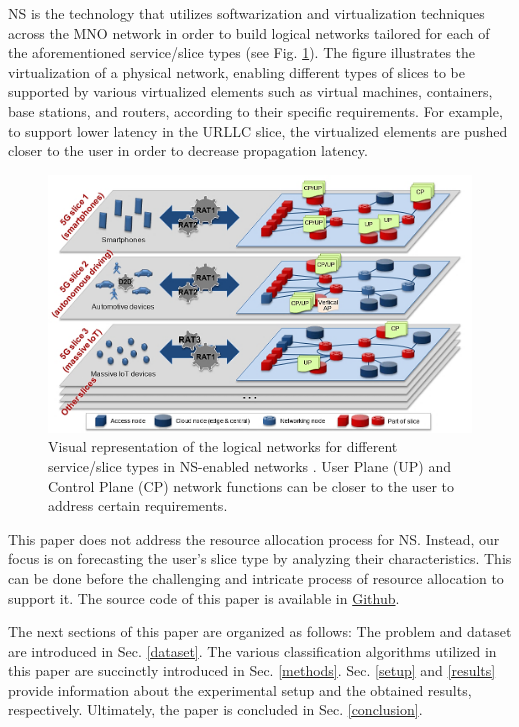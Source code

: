 \documentclass[conference]{IEEEtran}
\begin{document}
NS is the technology that utilizes softwarization and virtualization techniques across the MNO network in order to build logical networks tailored for each of the aforementioned service/slice types (see Fig. \ref{fig:slicing-overview}). The figure illustrates the virtualization of a physical network, enabling different types of slices to be supported by various virtualized elements such as virtual machines, containers, base stations, and routers, according to their specific requirements. For example, to support lower latency in the URLLC slice, the virtualized elements are pushed closer to the user in order to decrease propagation latency.

\begin{figure}
    \centering
    \includegraphics[width=0.7\columnwidth]{slicing-overview.png}
    \caption{Visual representation of the logical networks for different service/slice types in NS-enabled networks \cite{ngmn15wp5g}. User Plane (UP) and Control Plane (CP) network functions can be closer to the user to address certain requirements.}
    \label{fig:slicing-overview}
\end{figure}

This paper does not address the resource allocation process for NS. Instead, our focus is on forecasting the user's slice type by analyzing their characteristics. This can be done before the challenging and intricate process of resource allocation to support it. The source code of this paper is available in \href{https://github.com/sinaebrahimi/ml-7072cem}{Github}.

The next sections of this paper are organized as follows: The problem and dataset are introduced in Sec. \ref{dataset}. The various classification algorithms utilized in this paper are succinctly introduced in Sec. \ref{methods}. Sec. \ref{setup} and \ref{results} provide information about the experimental setup and the obtained results, respectively. Ultimately, the paper is concluded in Sec. \ref{conclusion}.
\end{document}
